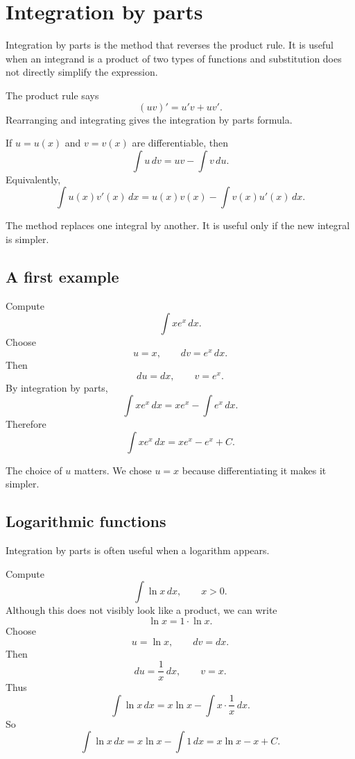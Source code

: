 \section{Integration by parts}

Integration by parts is the method that reverses the product rule. It is useful when an integrand is a product of two types of functions and substitution does not directly simplify the expression.

The product rule says
\[
(uv)'=u'v+uv'.
\]
Rearranging and integrating gives the integration by parts formula.

\begin{theorembox}
If \(u=u(x)\) and \(v=v(x)\) are differentiable, then
\[
\int u\,dv=uv-\int v\,du.
\]
Equivalently,
\[
\int u(x)v'(x)\,dx=u(x)v(x)-\int v(x)u'(x)\,dx.
\]
\end{theorembox}

The method replaces one integral by another. It is useful only if the new integral is simpler.

\subsection*{A first example}

\begin{examplebox}
Compute
\[
\int x e^x\,dx.
\]
Choose
\[
u=x,
\qquad
dv=e^x\,dx.
\]
Then
\[
du=dx,
\qquad
v=e^x.
\]
By integration by parts,
\[
\int x e^x\,dx=x e^x-\int e^x\,dx.
\]
Therefore
\[
\int x e^x\,dx=x e^x-e^x+C.
\]
\end{examplebox}

The choice of \(u\) matters. We chose \(u=x\) because differentiating it makes it simpler.

\subsection*{Logarithmic functions}

Integration by parts is often useful when a logarithm appears.

\begin{examplebox}
Compute
\[
\int \ln x\,dx,
\qquad x>0.
\]
Although this does not visibly look like a product, we can write
\[
\ln x=1\cdot\ln x.
\]
Choose
\[
u=\ln x,
\qquad
dv=dx.
\]
Then
\[
du=\frac1x\,dx,
\qquad
v=x.
\]
Thus
\[
\int \ln x\,dx=x\ln x-\int x\cdot\frac1x\,dx.
\]
So
\[
\int \ln x\,dx=x\ln x-\int 1\,dx=x\ln x-x+C.
\]
\end{examplebox}

